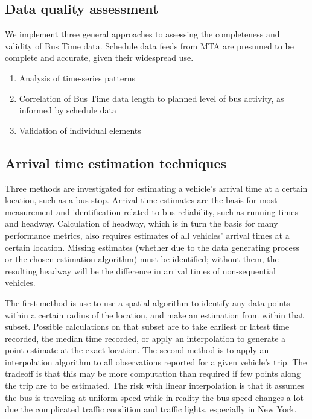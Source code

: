 \documentclass[12pt]{report}
\begin{document}
\subsection{Data quality assessment} 
We implement three general approaches to assessing the completeness and validity of Bus Time data.  Schedule data feeds from MTA are presumed to be complete and accurate, given their widespread use.

\begin{enumerate}
\item Analysis of time-series patterns
\item Correlation of Bus Time data length to planned level of bus activity, as informed by schedule data
\item Validation of individual elements
\end{enumerate}



\subsection{Arrival time estimation techniques}

Three methods are investigated for estimating a vehicle's arrival time at a certain location, such as a bus stop. Arrival time estimates are the basis for most measurement and identification related to bus reliability, such as running times and headway.  Calculation of headway, which is in turn the basis for many performance metrics, also requires estimates of all vehicles' arrival times at a certain location. Missing estimates (whether due to the data generating process or the chosen estimation algorithm) must be identified; without them, the resulting headway will be the difference in arrival times of non-sequential vehicles.

The first method is use to use a spatial algorithm to identify any data points within a certain radius of the location, and make an estimation from within that subset. Possible calculations on that subset are to take earliest or latest time recorded, the median time recorded, or apply an interpolation to generate a point-estimate at the exact location. The second method is to apply an interpolation algorithm to all observations reported for a given vehicle's trip. The tradeoff is that this may be more computation than required if few points along the trip are to be estimated.  The risk with linear interpolation is that it assumes the bus is traveling at uniform speed while in reality the bus speed changes a lot due the complicated traffic condition and traffic lights, especially in New York.
\end{document}
